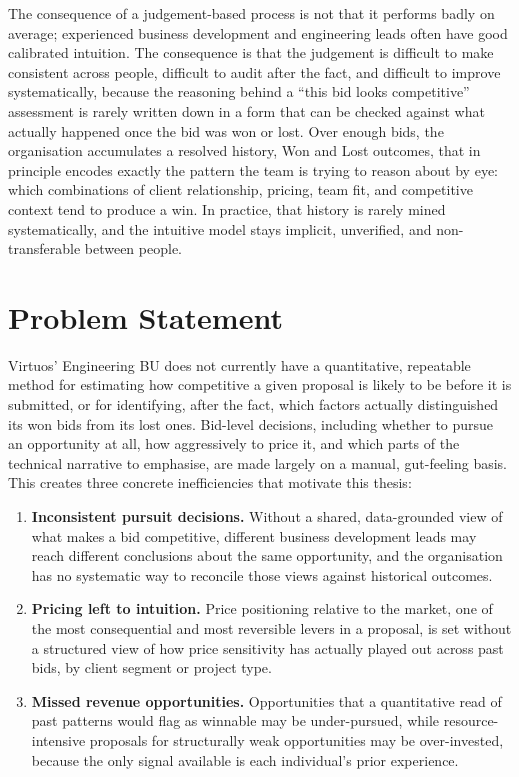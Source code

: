 \documentclass[12pt,oneside]{report}
\providecommand{\tightlist}{%
  \setlength{\itemsep}{0pt}\setlength{\parskip}{0pt}}
\begin{document}
The consequence of a judgement-based process is not that it performs
badly on average; experienced business development and engineering leads
often have good calibrated intuition. The consequence is that the
judgement is difficult to make consistent across people, difficult to
audit after the fact, and difficult to improve systematically, because
the reasoning behind a ``this bid looks competitive'' assessment is
rarely written down in a form that can be checked against what actually
happened once the bid was won or lost. Over enough bids, the
organisation accumulates a resolved history, Won and Lost outcomes, that
in principle encodes exactly the pattern the team is trying to reason
about by eye: which combinations of client relationship, pricing, team
fit, and competitive context tend to produce a win. In practice, that
history is rarely mined systematically, and the intuitive model stays
implicit, unverified, and non-transferable between people.

\hypertarget{problem-statement}{%
\section{Problem Statement}\label{problem-statement}}

Virtuos' Engineering BU does not currently have a quantitative,
repeatable method for estimating how competitive a given proposal is
likely to be before it is submitted, or for identifying, after the fact,
which factors actually distinguished its won bids from its lost ones.
Bid-level decisions, including whether to pursue an opportunity at all,
how aggressively to price it, and which parts of the technical narrative
to emphasise, are made largely on a manual, gut-feeling basis. This
creates three concrete inefficiencies that motivate this thesis:

\begin{enumerate}
\def\labelenumi{\arabic{enumi}.}
\tightlist
\item
  \textbf{Inconsistent pursuit decisions.} Without a shared,
  data-grounded view of what makes a bid competitive, different business
  development leads may reach different conclusions about the same
  opportunity, and the organisation has no systematic way to reconcile
  those views against historical outcomes.
\item
  \textbf{Pricing left to intuition.} Price positioning relative to the
  market, one of the most consequential and most reversible levers in a
  proposal, is set without a structured view of how price sensitivity
  has actually played out across past bids, by client segment or project
  type.
\item
  \textbf{Missed revenue opportunities.} Opportunities that a
  quantitative read of past patterns would flag as winnable may be
  under-pursued, while resource-intensive proposals for structurally
  weak opportunities may be over-invested, because the only signal
  available is each individual's prior experience.
\end{enumerate}
\end{document}
